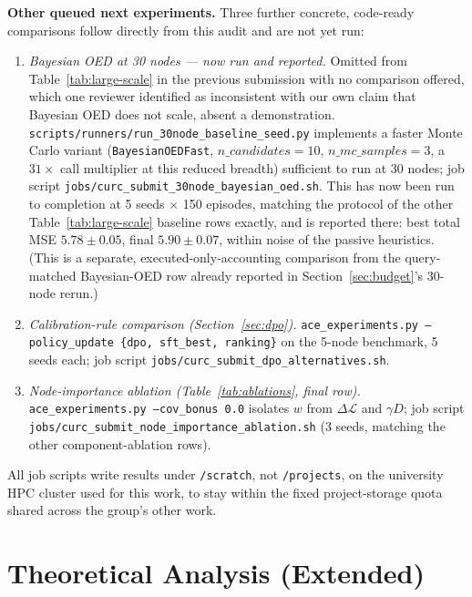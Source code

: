\textbf{Other queued next experiments.} Three further concrete, code-ready comparisons follow directly from this audit and are not yet run:
\begin{enumerate}[leftmargin=1.5em,topsep=0.2em,itemsep=0.1em]
\item \emph{Bayesian OED at 30 nodes --- now run and reported.} Omitted from Table~\ref{tab:large-scale} in the previous submission with no comparison offered, which one reviewer identified as inconsistent with our own claim that Bayesian OED does not scale, absent a demonstration. \texttt{scripts/runners/run\_30node\_baseline\_seed.py} implements a faster Monte Carlo variant (\texttt{BayesianOEDFast}, $n\_candidates{=}10$, $n\_mc\_samples{=}3$, a $31\times$ call multiplier at this reduced breadth) sufficient to run at 30 nodes; job script \texttt{jobs/curc\_submit\_30node\_bayesian\_oed.sh}. This has now been run to completion at 5 seeds $\times$ 150 episodes, matching the protocol of the other Table~\ref{tab:large-scale} baseline rows exactly, and is reported there: best total MSE $5.78\pm0.05$, final $5.90\pm0.07$, within noise of the passive heuristics. (This is a separate, executed-only-accounting comparison from the query-matched Bayesian-OED row already reported in Section~\ref{sec:budget}'s 30-node rerun.)
\item \emph{Calibration-rule comparison (Section~\ref{sec:dpo}).} \texttt{ace\_experiments.py --policy\_update \{dpo, sft\_best, ranking\}} on the 5-node benchmark, 5 seeds each; job script \texttt{jobs/curc\_submit\_dpo\_alternatives.sh}.
\item \emph{Node-importance ablation (Table~\ref{tab:ablations}, final row).} \texttt{ace\_experiments.py --cov\_bonus 0.0} isolates $w$ from $\Delta\mathcal L$ and $\gamma D$; job script \texttt{jobs/curc\_submit\_node\_importance\_ablation.sh} (3 seeds, matching the other component-ablation rows).
\end{enumerate}
All job scripts write results under \texttt{/scratch}, not \texttt{/projects}, on the university HPC cluster used for this work, to stay within the fixed project-storage quota shared across the group's other work.

\section{Theoretical Analysis (Extended)}
\label{app:theory}


